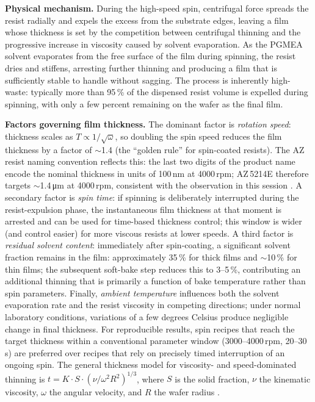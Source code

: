 \textbf{Physical mechanism.} During the high-speed spin, centrifugal
force spreads the resist radially and expels the excess from the
substrate edges, leaving a film whose thickness is set by the
competition between centrifugal thinning and the progressive increase
in viscosity caused by solvent evaporation. As the PGMEA solvent
evaporates from the free surface of the film during spinning, the
resist dries and stiffens, arresting further thinning and producing a
film that is sufficiently stable to handle without sagging. The
process is inherently high-waste: typically more than 95\,\% of the
dispensed resist volume is expelled during spinning, with only a few
percent remaining on the wafer as the final film.

\textbf{Factors governing film thickness.} The dominant factor is
\emph{rotation speed}: thickness scales as $T \propto
1/\sqrt{\omega}$, so doubling the spin speed reduces the film
thickness by a factor of $\sim$1.4 (the ``golden rule'' for
spin-coated resists). The AZ resist naming convention reflects this:
the last two digits of the product name encode the nominal thickness
in units of 100\,nm at 4000\,rpm; AZ\,5214E therefore targets
$\sim$1.4\,\si{\micro\meter} at 4000\,rpm, consistent with the
observation in this session \cite{AZ5214E_TDS}. A secondary factor is
\emph{spin time}: if spinning is deliberately interrupted during the
resist-expulsion phase, the instantaneous film thickness at that
moment is arrested and can be used for time-based thickness control;
this window is wider (and control easier) for more viscous resists at
lower speeds. A third factor is \emph{residual solvent content}:
immediately after spin-coating, a significant solvent fraction
remains in the film: approximately 35\,\% for thick films and
$\sim$10\,\% for thin films; the subsequent soft-bake step reduces
this to 3--5\,\%, contributing an additional thinning that is
primarily a function of bake temperature rather than spin parameters.
Finally, \emph{ambient temperature} influences both the solvent
evaporation rate and the resist viscosity in competing directions;
under normal laboratory conditions, variations of a few degrees
Celsius produce negligible change in final thickness. For
reproducible results, spin recipes that reach the target thickness
within a conventional parameter window (3000--4000\,rpm, 20--30\,s)
are preferred over recipes that rely on precisely timed interruption
of an ongoing spin. The general thickness model for viscosity- and
speed-dominated thinning is $t = K \cdot S \cdot (\nu / \omega^2
R^2)^{1/3}$, where $S$ is the solid fraction, $\nu$ the kinematic
viscosity, $\omega$ the angular velocity, and $R$ the wafer radius
\cite{FundTechProc2024}.

